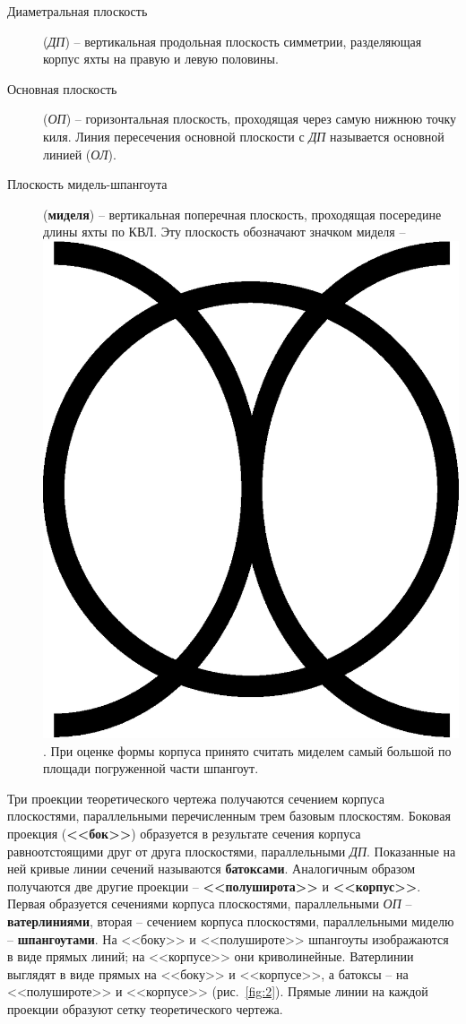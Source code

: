 \documentclass[a4paper, 12pt, twoside, final, book, russian, fittopage, cyremdash]{ncc}
\newcommand{\midelsign}{\includegraphics[scale=0.035]{midel_sign_vec.eps}\xspace}
\newcommand{\ris}[1]{\ref{fig:#1}}
\begin{document}
\begin{description}
\item [Диаметральная плоскость] (\textit{ДП}) \--- вертикальная продольная плоскость симметрии, разделяющая корпус яхты на правую и левую половины. 
\item [Основная плоскость] (\textit{ОП}) \--- горизонтальная плоскость, проходящая через самую нижнюю точку киля. Линия пересечения основной плоскости с \textit{ДП} называется основной линией (\textit{ОЛ}). 
\item [Плоскость мидель-шпангоута] (\textbf{миделя}) \--- вертикальная поперечная плоскость, проходящая посередине длины яхты по КВЛ. Эту плоскость обозначают значком миделя \--- \midelsign. При оценке формы корпуса принято считать миделем самый большой по площади погруженной части шпангоут. 
\end{description}

Три проекции теоретического чертежа получаются сечением корпуса плоскостями, параллельными перечисленным трем базовым плоскостям. Боковая проекция (\textbf{<<бок>>}) образуется в результате сечения корпуса равноотстоящими друг от друга плоскостями, параллельными \textit{ДП}. Показанные на ней кривые линии сечений называются \textbf{батоксами}. Аналогичным образом получаются две другие проекции \--- \textbf{<<полуширота>>} и \textbf{<<корпус>>}. Первая образуется сечениями корпуса плоскостями, параллельными \textit{ОП} \--- \textbf{ватерлиниями}, вторая \--- сечением корпуса плоскостями, параллельными миделю \--- \textbf{шпангоутами}. На <<боку>> и <<полушироте>> шпангоуты изображаются в виде прямых линий; на <<корпусе>> они криволинейные. Ватерлинии выглядят в виде прямых на <<боку>> и <<корпусе>>, а батоксы \--- на <<полушироте>> и <<корпусе>> (рис.~\ris{2}). Прямые линии на каждой проекции образуют сетку теоретического чертежа.
\end{document}
